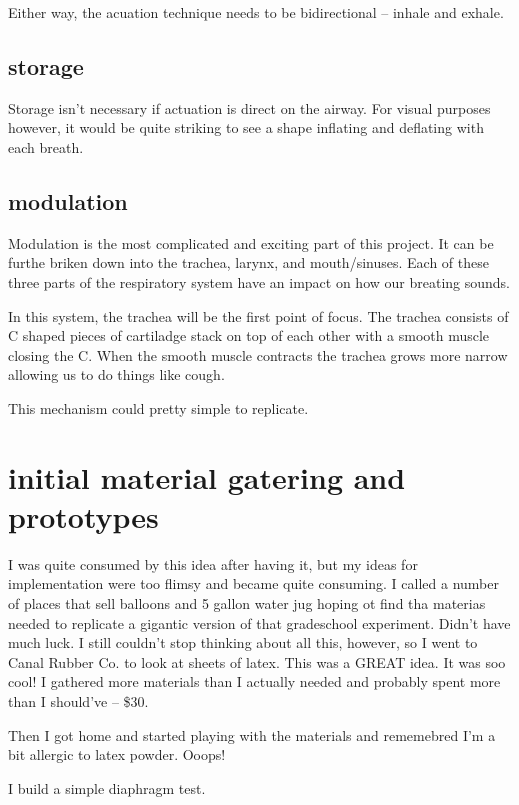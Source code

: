 \documentclass[11pt]{report}
\begin{document}
Either way, the acuation technique needs to be bidirectional -- inhale and exhale.

\subsection*{storage}

Storage isn't necessary if actuation is direct on the airway. For visual purposes however, it would be quite striking to see a shape inflating and deflating with each breath. 

\subsection*{modulation}

Modulation is the most complicated and exciting part of this project. It can be furthe briken down into the trachea, larynx, and mouth/sinuses. Each of these three parts of the respiratory system have an impact on how our breating sounds. 

In this system, the trachea will be the first point of focus. The trachea consists of C shaped pieces of cartiladge stack on top of each other with a smooth muscle closing the C. When the smooth muscle contracts the trachea grows more narrow allowing us to do things like cough. 


This mechanism could pretty simple to replicate. 


\section*{initial material gatering and prototypes}

I was quite consumed by this idea after having it, but my ideas for implementation were too flimsy and became quite consuming. I called a number of places that sell balloons and 5 gallon water jug hoping ot find tha materias needed to replicate a gigantic version of that gradeschool experiment. Didn't have much luck. I still couldn't stop thinking about all this, however, so I went to Canal Rubber Co. to look at sheets of latex. This was a GREAT idea. It was soo cool! I gathered more materials than I actually needed and probably spent more than I should've -- \$30.

Then I got home and started playing with the materials and rememebred I'm a bit allergic to latex powder. Ooops!

I build a simple diaphragm test. 
\end{document}
